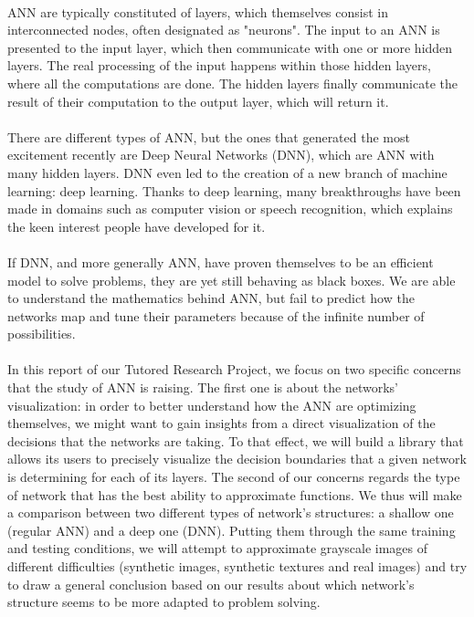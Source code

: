 \documentclass[a4paper]{article}
\begin{document}
\paragraph{}ANN are typically constituted of layers, which themselves consist in interconnected nodes, often designated as "neurons". The input to an ANN is presented to the input layer, which then communicate with one or more hidden layers. The real processing of the input happens within those hidden layers, where all the computations are done. The hidden layers finally communicate the result of their computation to the output layer, which will return it. \citep{Kriesel}

\paragraph{}There are different types of ANN, but the ones that generated the most excitement recently are Deep Neural Networks (DNN), which are ANN with many hidden layers. DNN even led to the creation of a new branch of machine learning: deep learning. Thanks to deep learning, many breakthroughs have been made in domains such as computer vision or speech recognition, which explains the keen interest people have developed for it.

\paragraph{}If DNN, and more generally ANN, have proven themselves to be an efficient model to solve problems, they are yet still behaving as black boxes. We are able to understand the mathematics behind ANN, but fail to predict how the networks map and tune their parameters because of the infinite number of possibilities. 

\paragraph{}In this report of our Tutored Research Project, we focus on two specific concerns that the study of ANN is raising. The first one is about the networks' visualization: in order to better understand how the ANN are optimizing themselves, we might want to gain insights from a direct visualization of the decisions that the networks are taking. To that effect, we will build a library that allows its users to precisely visualize the decision boundaries that a given network is determining for each of its layers. The second of our concerns regards the type of network that has the best ability to approximate functions. We thus will make a comparison between two different types of network's structures: a shallow one (regular ANN) and a deep one (DNN). Putting them through the same training and testing conditions, we will attempt to approximate grayscale images of different difficulties (synthetic images, synthetic textures and real images) and try to draw a general conclusion based on our results about which network's structure seems to be more adapted to problem solving.
\end{document}
